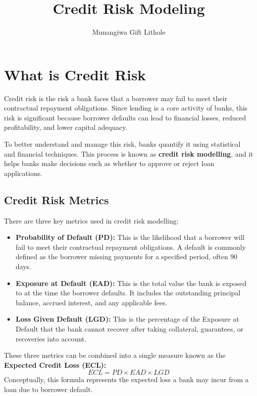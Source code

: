 \documentclass[
  letterpaper,
  DIV=11,
  numbers=noendperiod]{scrartcl}
\title{Credit Risk Modeling}
\author{Munangiwa Gift Lithole}
\date{}
\begin{document}
\maketitle


\section{What is Credit Risk}

Credit risk is the risk a bank faces that a borrower may fail to meet
their contractual repayment obligations. Since lending is a core
activity of banks, this risk is significant because borrower defaults
can lead to financial losses, reduced profitability, and lower capital
adequacy.

To better understand and manage this risk, banks quantify it using
statistical and financial techniques. This process is known as
\textbf{credit risk modelling}, and it helps banks make decisions such
as whether to approve or reject loan applications.

\subsection{Credit Risk Metrics}

There are three key metrics used in credit risk modelling:

\begin{itemize}
\item
  \textbf{Probability of Default (PD):} This is the likelihood that a
  borrower will fail to meet their contractual repayment obligations. A
  default is commonly defined as the borrower missing payments for a
  specified period, often 90 days.
\item
  \textbf{Exposure at Default (EAD):} This is the total value the bank
  is exposed to at the time the borrower defaults. It includes the
  outstanding principal balance, accrued interest, and any applicable
  fees.
\item
  \textbf{Loss Given Default (LGD):} This is the percentage of the
  Exposure at Default that the bank cannot recover after taking
  collateral, guarantees, or recoveries into account.
\end{itemize}

These three metrics can be combined into a single measure known as the
\textbf{Expected Credit Loss (ECL):} \[ECL = PD \times EAD \times LGD\]
Conceptually, this formula represents the expected loss a bank may incur
from a loan due to borrower default.
\end{document}
